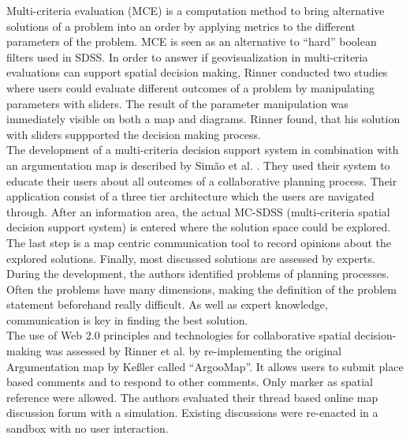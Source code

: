 Multi-criteria evaluation (MCE) is a computation method to bring alternative solutions of a problem into an order by applying metrics to the different parameters of the problem. MCE is seen as an alternative to ``hard'' boolean filters used in SDSS. In order to answer if geovisualization in multi-criteria evaluations can support spatial decision making, Rinner \cite{Rinner2007_geovis_decisionsupport} conducted two studies where users could evaluate different outcomes of a problem by manipulating parameters with sliders. The result of the parameter manipulation was immediately visible on both a map and diagrams. Rinner found, that his solution with sliders suppported the decision making process.\\
The development of a multi-criteria decision support system in combination with an argumentation map is described by Sim\~{a}o et al. \cite{Simao2009Webbased}. They used their system to educate their users about all outcomes of a collaborative planning process. Their application consist of a three tier architecture which the users are navigated through. After an information area, the actual MC-SDSS (multi-criteria spatial decision support system) is entered where the solution space could be explored. The last step is a map centric communication tool to record opinions about the explored solutions. Finally, most discussed solutions are assessed by experts. During the development, the authors identified problems of planning processes. Often the problems have many dimensions, making the definition of the problem statement beforehand really difficult. As well as expert knowledge, communication is key in finding the best solution.\\
The use of Web 2.0 principles and technologies for collaborative spatial decision-making was assessed by Rinner \cite{Rinner2009_Web2_argumap} et al. by re-implementing the original Argumentation map by Ke{\ss}ler \cite{Kessler2005_ArgumentationMapPrototype} called ``ArgooMap''. It allows users to submit place based comments and to respond to other comments. Only marker as spatial reference were allowed. The authors evaluated their thread based online map discussion forum with a simulation. Existing discussions were re-enacted in a sandbox with no user interaction.\\
